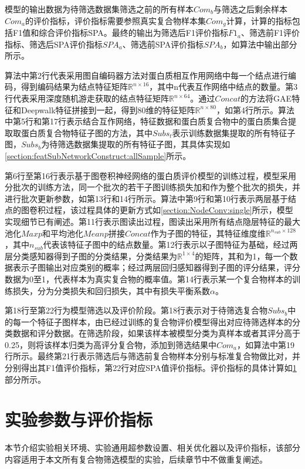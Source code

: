模型的输出数据为待筛选数据集筛选之前的所有样本$Com_b$与筛选之后剩余样本$Com_a$的评价指标，评价指标需要参照真实复合物样本集$Com_g$计算，计算的指标包括F1值和综合评价指标SPA。最终的输出为筛选后F1评价指标$F1_a$、筛选前F1评价指标、筛选后SPA评价指标$SPA_a$、筛选前SPA评价指标$SPA_b$，如算法中输出部分所示。

算法中第2行代表采用图自编码器方法对蛋白质相互作用网络中每一个结点进行编码，得到编码结果为结点特征矩阵$\mathbb{R}^{n\times 16}$，其中n代表互作网络中结点的数量。第3行代表采用深度随机游走获取的结点特征矩阵$\mathbb{R}^{n\times 64}$。通过$Concat$的方法将GAE特征和Deepwalk特征拼接到一起，得到80维的特征矩阵$\mathbb{R}^{n\times 80}$，如第4行所示。算法中第5行和第17行表示结合互作网络，特征数据和蛋白质复合物中的蛋白质集合提取取蛋白质复合物特征子图的方法，其中$Subs_t$表示训练数据集提取的所有特征子图，$Subs_b$为待筛选数据集提取的所有特征子图，其具体实现如\ref{section:featSubNetworkConstruct:allSample}所示。

第6行至第16行表示基于图卷积神经网络的蛋白质评价模型的训练过程，模型采用分批次的训练方法，同一个批次的若干子图训练损失加和作为整个批次的损失，并进行批次更新参数，如第13行和14行所示。算法中第9行和第10行表示两层基于结点的图卷积过程，该过程具体的更新方式如\ref{section:NodeConv:single}所示，模型实现细节已有阐述。第11行表示图读出过程，图读出采用所有结点隐层特征的最大池化$Maxp$和平均池化$Meanp$拼接$Concat$作为子图的特征，其特征维度维$\mathbb{R}^{n_{sub}\times 128}$，其中$n_{sub}$代表该特征子图中的结点数量。第12行表示以子图特征为基础，经过两层分类感知器得到子图的分类结果，分类结果为$\mathbb{R}^{1\times 4}$的矩阵，其和为1，每一个数据表示子图输出对应类别的概率；经过两层回归感知器得到子图的评分结果，评分数据为0至1，代表样本为真实复合物的概率值。第14行表示某一个复合物样本的训练损失，分为分类损失和回归损失，其中有损失平衡系数$\alpha$。

第18行至第22行为模型筛选以及评价阶段。第18行表示对于待筛选复合物$Subs_b$中的每一个特征子图样本，由已经过训练的复合物评价模型得出对应待筛选样本的分类数据和评分数据。在筛选阶段，如果该样本被模型分类为真样本或者其评分高于0.25，则将该样本归类为高评分复合物，添加到筛选结果中$Com_a$，如算法中第19行所示。最终第21行表示筛选后与筛选前复合物样本分别与标准复合物做比对，并分别得出其F1值评价指标，第22行对应SPA值评价指标。评价指标的具体计算如\ref{section:NodeConv:allExperienceDesign}部分所示。

\section{实验参数与评价指标}
\label{section:NodeConv:allExperienceDesign}
本节介绍实验相关环境、实验通用超参数设置、相关优化器以及评价指标，该部分内容适用于本文所有复合物筛选模型的实验，后续章节中不做重复阐述。

